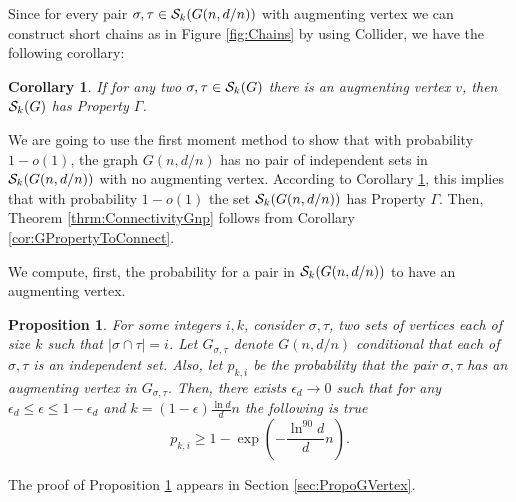 \documentclass[a4paper,10pt]{article}
\newtheorem{proposition}{Proposition}\renewcommand{\theproposition}{\arabic{proposition}}
\newtheorem{corollary}{Corollary}\renewcommand{\thecorollary}{\arabic{corollary}}
\begin{document}
\noindent
Since for every pair $\sigma,\tau\in {\cal S}_k(G(n,d/n))$ with
augmenting vertex we can construct short chains as in Figure
\ref{fig:Chains} by using Collider, we have the following corollary:


\begin{corollary}\label{cor:Augment2GProperty}
If for any two $\sigma,\tau \in {\cal S}_k(G)$ there is an
{\em augmenting} vertex $v$, then ${\cal S}_k(G)$ has Property
$\Gamma$.
\end{corollary}


We are going to use the first moment method to show that with
probability $1-o(1)$, the graph $G(n,d/n)$ has no pair of
independent sets in ${\cal S}_{k}(G(n,d/n))$ with no augmenting
vertex. According to Corollary \ref{cor:Augment2GProperty}, this
implies that with probability $1-o(1)$ the set ${\cal S}_k
(G(n,d/n))$ has Property $\Gamma$. Then, Theorem
\ref{thrm:ConnectivityGnp} follows from Corollary \ref{cor:GPropertyToConnect}.



We compute, first,  the probability for a pair in ${\cal S}_k(G(n,d/n))$
to have an augmenting vertex.


\begin{proposition}\label{lemma:PropertyGVertex}
For some integers $i,k$, consider $\sigma,\tau$, two sets of
vertices each of size $k$ such that $|\sigma \cap \tau|=i$. Let
$G_{\sigma,\tau}$ denote $G(n,d/n)$ conditional that each of
$\sigma,\tau$ is an independent set. Also, let  $p_{k,i}$ be
the probability that the pair $\sigma, \tau$ has an {\em augmenting
vertex} in $G_{\sigma,\tau}$. Then, there exists $\epsilon_d\to 0$
such that for any $\epsilon_d\leq\epsilon\leq 1-\epsilon_d$ and
$k=(1-\epsilon)\frac{\ln d}{d}n$ the following is true
\begin{displaymath}
p_{k,i}\geq 1-\exp\left(-\frac{\ln^{90}d}{d}n \right).
\end{displaymath}
\end{proposition}
The proof of Proposition \ref{lemma:PropertyGVertex} appears in 
Section \ref{sec:PropoGVertex}.\\
\end{document}
